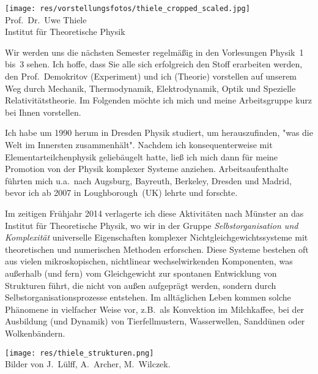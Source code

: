 \newpage

\begin{multicols}{2}
\begin{center}
\texttt{[image: res/vorstellungsfotos/thiele\_cropped\_scaled.jpg]}\\
Prof.\ Dr.\ Uwe Thiele\\
Institut für Theoretische Physik
\end{center}

Wir werden uns die nächsten Semester regelmäßig in den Vorlesungen Physik~1 bis~3 sehen. Ich hoffe, dass Sie alle sich erfolgreich den Stoff erarbeiten werden, den Prof.\ Demokritov (Experiment) und ich (Theorie) vorstellen auf unserem Weg durch Mechanik, Thermodynamik, Elektrodynamik, Optik und Spezielle Relativitätstheorie. Im Folgenden möchte ich mich und meine Arbeitsgruppe kurz bei Ihnen vorstellen.

Ich habe um 1990 herum in Dresden Physik studiert, um herauszufinden, "was die Welt im Innersten zusammenhält". Nachdem ich konsequenterweise mit Elementarteilchenphysik geliebäugelt hatte, ließ ich mich dann für meine Promotion von der Physik komplexer Systeme anziehen. Arbeitsaufenthalte führten mich u.a.\ nach Augsburg, Bayreuth, Berkeley, Dresden und Madrid, bevor ich ab 2007 in Loughborough~(UK) lehrte und forschte.

Im zeitigen Frühjahr 2014 verlagerte ich diese Aktivitäten nach Münster an das Institut für Theoretische Physik, wo wir in der Gruppe \textit{Selbstorganisation und Komplexität} universelle Eigenschaften komplexer Nichtgleichgewichtssysteme mit theoretischen und numerischen Methoden erforschen. Diese Systeme bestehen oft aus vielen mikroskopischen, nichtlinear wechselwirkenden Komponenten, was außerhalb (und fern) vom Gleichgewicht zur spontanen Entwicklung von Strukturen führt, die nicht von außen aufgeprägt werden, sondern durch Selbstorganisationsprozesse entstehen. Im alltäglichen Leben kommen solche Phänomene in vielfacher Weise vor, z.B.\ als Konvektion im Milchkaffee, bei der Ausbildung (und Dynamik) von Tierfellmustern, Wasserwellen, Sanddünen oder Wolkenbändern.

\begin{center}
\texttt{[image: res/thiele\_strukturen.png]}\\
{\footnotesize %
Bilder von J.\ Lülff, A.\ Archer, M.\ Wilczek.}
\end{center}


\end{multicols}
